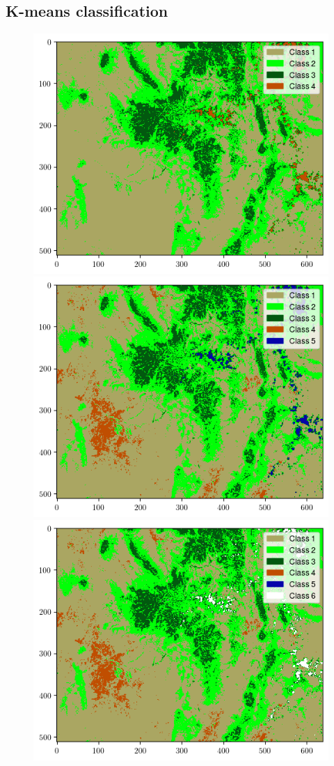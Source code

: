 \documentclass[12pt]{article}
\begin{document}
\clearpage

\subsection{K-means classification}

\begin{figure}[h!]
    \centering
    \includegraphics[width=.48\linewidth]{figures/p6/k-means_M10+M15_4cat.png}
    \includegraphics[width=.48\linewidth]{figures/p6/k-means_M10+M15_5cat.png}
    \includegraphics[width=.48\linewidth]{figures/p6/k-means_M10+M15_6cat.png}

\end{figure}
\end{document}
